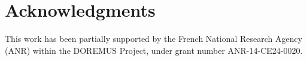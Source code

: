 \documentclass[runningheads,a4paper]{llncs}
\begin{document}


\section*{Acknowledgments}
This work has been partially supported by the French National Research Agency (ANR) within the DOREMUS Project, under grant number ANR-14-CE24-0020.



\end{document}
